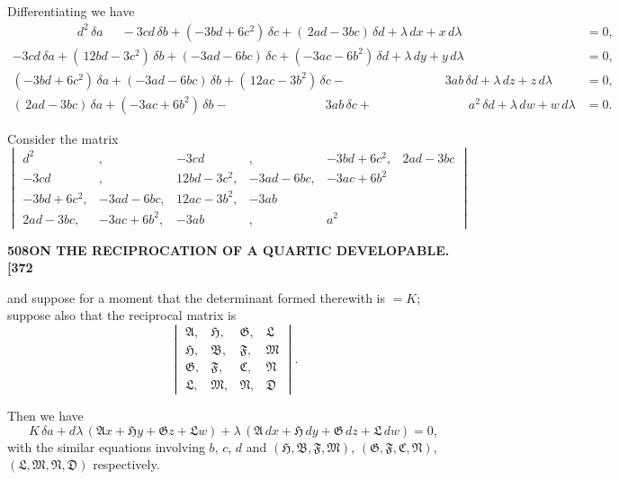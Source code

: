 \documentclass[11pt,a4paper]{article}
\begin{document}
Differentiating we have
\begin{align*}
\phantom{-3cd\,\delta a + (}\,d^{2}\,\delta a \phantom{)\,\delta b} - 3cd\,\delta b + (-3bd + 6c^{2})\,\delta c + (\,2ad - 3bc)\,\delta d + \lambda\,dx + x\,d\lambda &= 0,\\
-3cd\,\delta a + (\,12bd - 3c^{2})\,\delta b + (-3ad - 6bc)\,\delta c + (-3ac - 6b^{2})\,\delta d + \lambda\,dy + y\,d\lambda &= 0,\\
(-3bd + 6c^{2})\,\delta a + (-3ad - 6bc)\,\delta b + (\,12ac - 3b^{2})\,\delta c - \phantom{(-3ac + 6b^{2})\,\delta d}\,3ab\,\delta d + \lambda\,dz + z\,d\lambda &= 0,\\
(\,2ad - 3bc)\,\delta a + (-3ac + 6b^{2})\,\delta b - \phantom{(\,12ac - 3b^{2})\,\delta c}\,3ab\,\delta c + \phantom{(\,12bd - 3c^{2})\,\delta c}\,a^{2}\,\delta d + \lambda\,dw + w\,d\lambda &= 0.
\end{align*}

Consider the matrix
\[
\begin{vmatrix}
d^{2} & , & -3cd & , & -3bd + 6c^{2}, & 2ad - 3bc \\[2pt]
-3cd & , & 12bd - 3c^{2}, & -3ad - 6bc, & -3ac + 6b^{2} \\[2pt]
-3bd + 6c^{2}, & -3ad - 6bc, & 12ac - 3b^{2}, & -3ab \\[2pt]
2ad - 3bc, & -3ac + 6b^{2}, & -3ab & , & a^{2}
\end{vmatrix}
\]

\newpage
\noindent\textbf{508\hspace{1em}ON THE RECIPROCATION OF A QUARTIC DEVELOPABLE.\hfill[372}

\vspace{12pt}

\noindent
and suppose for a moment that the determinant formed therewith is $= K$; suppose also that the reciprocal matrix is
\[
\begin{vmatrix}
\mathfrak{A}, & \mathfrak{H}, & \mathfrak{G}, & \mathfrak{L} \\
\mathfrak{H}, & \mathfrak{B}, & \mathfrak{F}, & \mathfrak{M} \\
\mathfrak{G}, & \mathfrak{F}, & \mathfrak{C}, & \mathfrak{N} \\
\mathfrak{L}, & \mathfrak{M}, & \mathfrak{N}, & \mathfrak{D}
\end{vmatrix}.
\]

Then we have
\[
K\,\delta a + d\lambda\,(\mathfrak{A}x + \mathfrak{H}y + \mathfrak{G}z + \mathfrak{L}w) + \lambda\,(\mathfrak{A}\,dx + \mathfrak{H}\,dy + \mathfrak{G}\,dz + \mathfrak{L}\,dw) = 0,
\]
with the similar equations involving $b$, $c$, $d$ and $(\mathfrak{H}, \mathfrak{B}, \mathfrak{F}, \mathfrak{M})$, $(\mathfrak{G}, \mathfrak{F}, \mathfrak{C}, \mathfrak{N})$, $(\mathfrak{L}, \mathfrak{M}, \mathfrak{N}, \mathfrak{D})$ respectively.
\end{document}
